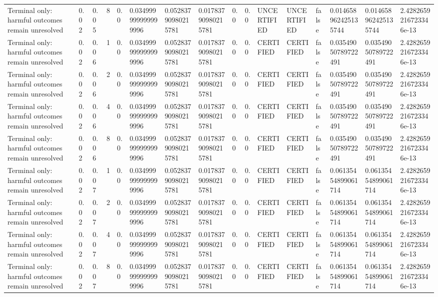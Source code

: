 \begin{tabular}{llllllllllllllll}
Terminal only: harmful outcomes remain unresolved & 0.02 & 0.05 & 8 & 0.0 & 0.034999999999999996 & 0.05283790980215781 & 0.01783790980215781 & 0.0 & 0.0 & UNCERTIFIED & UNCERTIFIED & false & 0.014658962425135744 & 0.014658962425135744 & 2.4282659216723346e-13 \\
Terminal only: harmful outcomes remain unresolved & 0.02 & 0.06 & 1 & 0.0 & 0.034999999999999996 & 0.05283790980215781 & 0.01783790980215781 & 0.0 & 0.0 & CERTIFIED & CERTIFIED & false & 0.03549050789722491 & 0.03549050789722491 & 2.4282659216723346e-13 \\
Terminal only: harmful outcomes remain unresolved & 0.02 & 0.06 & 2 & 0.0 & 0.034999999999999996 & 0.05283790980215781 & 0.01783790980215781 & 0.0 & 0.0 & CERTIFIED & CERTIFIED & false & 0.03549050789722491 & 0.03549050789722491 & 2.4282659216723346e-13 \\
Terminal only: harmful outcomes remain unresolved & 0.02 & 0.06 & 4 & 0.0 & 0.034999999999999996 & 0.05283790980215781 & 0.01783790980215781 & 0.0 & 0.0 & CERTIFIED & CERTIFIED & false & 0.03549050789722491 & 0.03549050789722491 & 2.4282659216723346e-13 \\
Terminal only: harmful outcomes remain unresolved & 0.02 & 0.06 & 8 & 0.0 & 0.034999999999999996 & 0.05283790980215781 & 0.01783790980215781 & 0.0 & 0.0 & CERTIFIED & CERTIFIED & false & 0.03549050789722491 & 0.03549050789722491 & 2.4282659216723346e-13 \\
Terminal only: harmful outcomes remain unresolved & 0.02 & 0.07 & 1 & 0.0 & 0.034999999999999996 & 0.05283790980215781 & 0.01783790980215781 & 0.0 & 0.0 & CERTIFIED & CERTIFIED & false & 0.06135454899061714 & 0.06135454899061714 & 2.4282659216723346e-13 \\
Terminal only: harmful outcomes remain unresolved & 0.02 & 0.07 & 2 & 0.0 & 0.034999999999999996 & 0.05283790980215781 & 0.01783790980215781 & 0.0 & 0.0 & CERTIFIED & CERTIFIED & false & 0.06135454899061714 & 0.06135454899061714 & 2.4282659216723346e-13 \\
Terminal only: harmful outcomes remain unresolved & 0.02 & 0.07 & 4 & 0.0 & 0.034999999999999996 & 0.05283790980215781 & 0.01783790980215781 & 0.0 & 0.0 & CERTIFIED & CERTIFIED & false & 0.06135454899061714 & 0.06135454899061714 & 2.4282659216723346e-13 \\
Terminal only: harmful outcomes remain unresolved & 0.02 & 0.07 & 8 & 0.0 & 0.034999999999999996 & 0.05283790980215781 & 0.01783790980215781 & 0.0 & 0.0 & CERTIFIED & CERTIFIED & false & 0.06135454899061714 & 0.06135454899061714 & 2.4282659216723346e-13 \\

\end{tabular}
